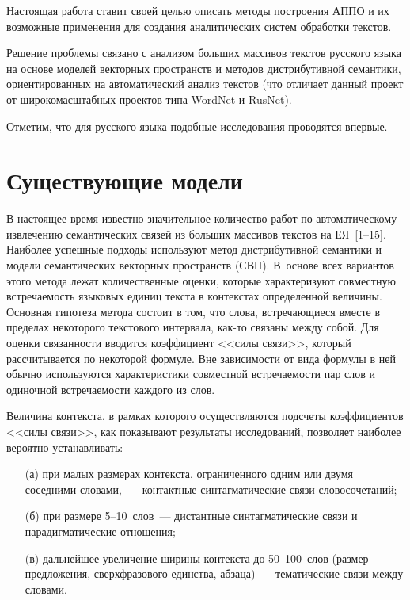 \begin{multicols}{2}
     Настоящая работа ставит своей целью описать методы построения 
АППО и их возможные применения для создания аналитических систем 
обработки текстов. 
     
     Решение проблемы связано с анализом больших массивов текстов 
русского языка на основе моделей векторных пространств и методов 
дистрибутивной семантики, ориентированных на автоматический анализ 
текстов (что отличает данный проект от широкомасштабных проектов типа 
WordNet и RusNet). 
     
     Отметим, что для русского языка подобные исследования проводятся 
впервые.
    
    \section{Существующие модели}
     
     В настоящее время известно значительное количество работ по 
автоматическому извлечению семантических связей из больших массивов 
текстов на ЕЯ~[1--15]. Наиболее успешные подходы используют метод 
дистрибутивной семантики и модели семантических векторных 
пространств (СВП). В~основе всех вариантов этого метода лежат 
количественные оценки, которые характеризуют совместную 
встречаемость языковых единиц текста в контекстах определенной 
величины. Основная гипотеза метода состоит в том, что слова, 
встречающиеся вместе в пределах некоторого текстового интервала, как-то 
связаны между собой. Для оценки связанности вводится коэффициент 
<<силы связи>>, который рассчитывается по некоторой формуле. Вне 
зависимости от вида формулы в ней обычно используются характеристики 
совместной встречаемости пар слов и одиночной встречаемости каждого 
из слов.
     
     Величина контекста, в рамках которого осуществляются подсчеты 
коэффициентов <<силы связи>>, как показывают результаты 
исследований, позволяет наиболее вероятно устанавливать:
\begin{itemize}
\item[(а)] при малых 
размерах контекста, ограниченного одним или двумя соседними 
словами,~--- контактные синтагматические связи словосочетаний;
\item[(б)] при  размере 
     5--10~слов~--- дистантные синтагматические связи и 
парадигматические отношения; 
\item[(в)] дальнейшее увеличение ширины 
контекста до 50--100~слов (размер предложения, сверхфразового 
единства, абзаца)~--- тематические связи между словами.
\end{itemize}


\end{multicols}

